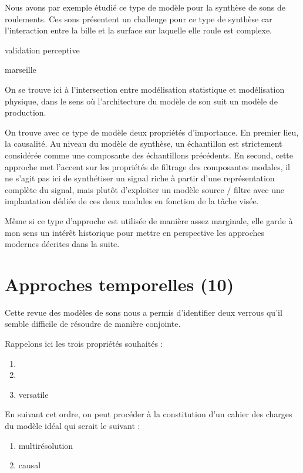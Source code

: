 Nous avons par exemple étudié ce type de modèle pour la synthèse de sons de roulements. Ces sons présentent un challenge pour ce type de synthèse car l'interaction entre la bille et la surface sur laquelle elle roule est complexe.

 \cite{LagrangeTasslp10}

 validation perceptive

 \cite{Murphy11a}

marseille \cite{conan2014synthesis}

On se trouve ici à l'intersection entre modélisation statistique et modélisation physique, dans le sens où l'architecture du modèle de son suit un modèle de production.



On trouve avec ce type de modèle deux propriétés d'importance. En premier lieu, la causalité. Au niveau du modèle de synthèse, un échantillon est strictement considérée comme une composante des échantillons précédents.  En second, cette approche met l'accent sur les propriétés de filtrage des composantes modales, il ne s'agit pas ici de synthétiser un signal riche à partir d'une représentation complète du signal, mais plutôt d'exploiter un modèle source / filtre avec une implantation dédiée de ces deux modules en fonction de la tâche visée.

Même si ce type d'approche est utilisée de manière assez marginale, elle garde à mon sens un intérêt historique pour mettre en perspective les approches modernes décrites dans la suite.

\section{Approches temporelles (10)}

Cette revue des modèles de sons nous a permis d'identifier deux verrous qu'il semble difficile de résoudre de manière conjointe.

Rappelons ici les trois propriétés souhaités :
\begin{enumerate}
  \item
  \item
  \item versatile
\end{enumerate}

En suivant cet ordre, on peut procéder à la constitution d'un \og cahier des charges \fg du modèle idéal qui serait le suivant :
\begin{enumerate}
  \item multirésolution
  \item causal

\end{enumerate}

